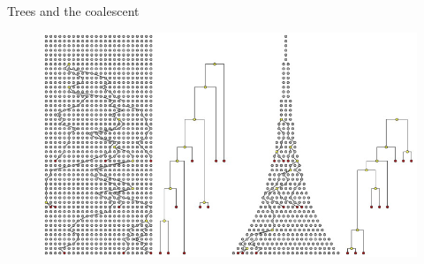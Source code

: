 \documentclass[newPxFont,numfooter,sectionpages]{beamer}
\begin{document}
\begin{frame}{Trees and the coalescent}
\begin{figure}
	\includegraphics[scale=0.6]{figures/coalescent_serially_sampled.jpg} 
\end{figure}
\end{frame}
\end{document}
